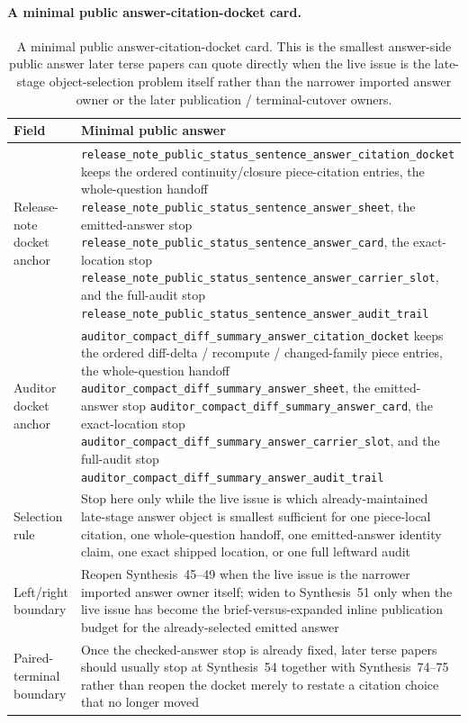 \documentclass[11pt]{article}
\begin{document}
\paragraph{A minimal public answer-citation-docket card.}
\begin{table}[t]
\centering
\small
\begin{tabularx}{\linewidth}{@{}lX@{}}
\toprule
Field & Minimal public answer \\
\midrule
Release-note docket anchor & \nolinkurl{release_note_public_status_sentence_answer_citation_docket} keeps the ordered continuity/closure piece-citation entries, the whole-question handoff \nolinkurl{release_note_public_status_sentence_answer_sheet}, the emitted-answer stop \nolinkurl{release_note_public_status_sentence_answer_card}, the exact-location stop \nolinkurl{release_note_public_status_sentence_answer_carrier_slot}, and the full-audit stop \nolinkurl{release_note_public_status_sentence_answer_audit_trail} \\
Auditor docket anchor & \nolinkurl{auditor_compact_diff_summary_answer_citation_docket} keeps the ordered diff-delta / recompute / changed-family piece entries, the whole-question handoff \nolinkurl{auditor_compact_diff_summary_answer_sheet}, the emitted-answer stop \nolinkurl{auditor_compact_diff_summary_answer_card}, the exact-location stop \nolinkurl{auditor_compact_diff_summary_answer_carrier_slot}, and the full-audit stop \nolinkurl{auditor_compact_diff_summary_answer_audit_trail} \\
Selection rule & Stop here only while the live issue is which already-maintained late-stage answer object is smallest sufficient for one piece-local citation, one whole-question handoff, one emitted-answer identity claim, one exact shipped location, or one full leftward audit \\
Left/right boundary & Reopen Synthesis~45--49 when the live issue is the narrower imported answer owner itself; widen to Synthesis~51 only when the live issue has become the brief-versus-expanded inline publication budget for the already-selected emitted answer \\
Paired-terminal boundary & Once the checked-answer stop is already fixed, later terse papers should usually stop at Synthesis~54 together with Synthesis~74--75 rather than reopen the docket merely to restate a citation choice that no longer moved \\
\bottomrule
\end{tabularx}
\caption{A minimal public answer-citation-docket card. This is the smallest answer-side public answer later terse papers can quote directly when the live issue is the late-stage object-selection problem itself rather than the narrower imported answer owner or the later publication / terminal-cutover owners.}
\label{tab:minimal-public-answer-citation-docket-card}
\end{table}
\end{document}
